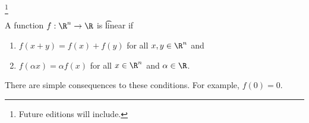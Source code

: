 
  \ifhmode\unskip\fi\footnote{
Future editions will include.
  }

A function $f: \R^n \to \R$ is \t{linear} if
  \begin{enumerate}
  \item $f(x + y) = f(x) + f(y)$ for all $x, y \in \R^n$ and
  \item $f(\alpha x) = \alpha f(x)$ for all $x \in \R^n$ and $\alpha \in \R$.
  \end{enumerate}
There are simple consequences to these conditions.
For example, $f(0) = 0$.

\blankpage
